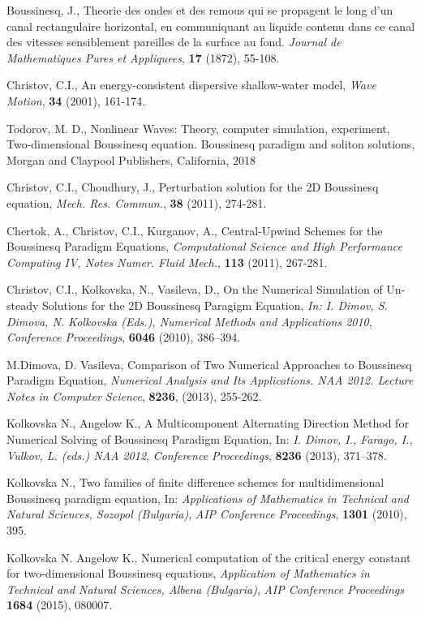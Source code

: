 \documentclass[a5paper]{article}
\theoremstyle{remark}
\begin{document}
\begin{normalsize}
\begin{thebibliography}{99}
	 Boussinesq, J., Theorie des ondes et des remous qui se propagent le long d'un canal rectangulaire horizontal, en communiquant au liquide contenu dans ce canal des vitesses sensiblement pareilles de la surface au fond.  {\it Journal de Mathematiques Pures et Appliquees}, \textbf{17} (1872), 55-108.

	 Christov, C.I., An energy-consistent dispersive shallow-water model,  {\it Wave Motion}, \textbf{34} (2001), 161-174.

	 Todorov, M. D., Nonlinear Waves: Theory, computer simulation, experiment, Two-dimensional Boussinesq equation. Boussinesq paradigm and soliton solutions, Morgan and Claypool Publishers, California, 2018

	 Christov, C.I., Choudhury, J., Perturbation solution for the 2D Boussinesq equation, {\it Mech. Res. Commun.}, \textbf{38} (2011), 274-281.

	 Chertok, A., Christov, C.I., Kurganov, A., Central-Upwind Schemes for the Boussinesq Paradigm Equations,
{\it Computational Science and High Performance Computing IV, Notes Numer. Fluid Mech.}, \textbf{113} (2011), 267-281.

	 Christov, C.I., Kolkovska, N., Vasileva, D., On the Numerical Simulation of Un-steady Solutions for the 2D Boussinesq Paragigm Equation,
{\it In: I. Dimov, S. Dimova, N. Kolkovska (Eds.), Numerical Methods and Applications 2010},
\emph{Conference Proceedings}, \textbf{6046} (2010), 386–394.

	 M.Dimova, D. Vasileva, Comparison of Two Numerical Approaches to Boussinesq Paradigm Equation, 
{\it Numerical Analysis and Its Applications. NAA 2012. Lecture Notes in Computer Science}, \textbf{8236}, (2013), 255-262.

	 Kolkovska N., Angelow K., A Multicomponent Alternating Direction Method for Numerical Solving of Boussinesq Paradigm Equation,
In: {\it  I. Dimov, I., Farago, I., Vulkov, L. (eds.) NAA 2012},
\emph{Conference Proceedings}, \textbf{8236} (2013), 371–378.

	 Kolkovska N., Two families of finite difference schemes for multidimensional Boussinesq paradigm equation, In:
{\it Applications of Mathematics in Technical and Natural Sciences,  Sozopol (Bulgaria)},
\emph{AIP Conference Proceedings}, \textbf{1301} (2010), 395.

	 Kolkovska N. Angelow K., Numerical computation of the critical energy constant for two-dimensional Boussinesq equations,
{\it Application of Mathematics in Technical and Natural Sciences, Albena (Bulgaria)},
\emph{AIP Conference Proceedings}  \textbf{1684} (2015), 080007.


\end{thebibliography}
\end{normalsize}
\end{document}
